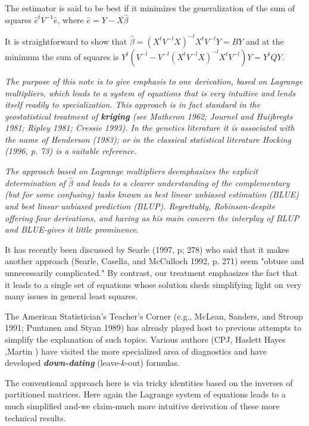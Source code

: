 \documentclass[12pt, a4paper]{article}
\begin{document}
The estimator is said to be best if it minimizes the generalization of the sum of squares $\hat{e}^{t}V^{-1}\hat{e}$, where $\hat{e} = Y- X\hat{\beta}$

\newpage

It is straightforward to show that $\hat{\beta} = (X^tV^{-l}X)^{-l}X^tV^{-l}Y = BY$ and at the minimum the sum of squares is $Y^{t} (V^{-l}  - V^{-l}(X^tV^{-l}X)^{-l}X^tV^{-l})Y = Y^{t}QY$.\\
\bigskip

\emph{The purpose of this note is to give emphasis to one derivation, based on Lagrange multipliers, which leads to a system of equations that is very intuitive and lends itself readily to specialization. This approach is in fact standard in the geostatistical treatment of \textbf{kriging} (see Matheron 1962; Journel and Huijbregts 1981; Ripley 1981; Cressie 1993). In the genetics literature it is associated with the name of Henderson (1983); or in the classical statistical literature Hocking (1996, p. 73) is a suitable reference.}

\emph{The approach based on Lagrange multipliers deemphasizes the explicit determination of $\hat{\beta}$ and leads to a clearer understanding of the complementary (but for some confusing) tasks known as best linear unbiased estimation (BLUE) and best linear unbiased prediction (BLUP). Regrettably, Robinson-despite offering four derivations, and having as his main concern the interplay of BLUP and BLUE-gives it little prominence.}

It has recently been discussed by Searle (1997, p; 278) who said that it makes another approach (Searle, Casella, and McCulloch 1992, p. 271) seem "obtuse and unnecessarily complicated." By contrast, our treatment emphasizes the fact that it leads to a single set of equations whose solution sheds simplifying light on very many issues in general least squares.

The American Statistician's Teacher's Corner (e.g., McLean, Sanders, and Stroup 1991; Puntanen and Styan 1989) has already played host to previous attempts to simplify the explanation of such topics. Various authors (CPJ, Haslett Hayes ,Martin ) have visited the more specialized area of diagnostics and have developed \textbf{\emph{down-dating}} (leave-$k$-out) formulas.

The conventional approach here is via tricky identities based on the inverses of partitioned matrices. Here again the Lagrange system of equations leads to a much simplified and-we claim-much more intuitive derivation of these more technical results.
\end{document}
